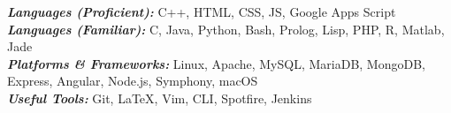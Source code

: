 

\begin{cvparagraph}
  \textbf{\textit{Languages (Proficient): }} C++, HTML, CSS, JS, Google Apps Script\\
  \textbf{\textit{Languages (Familiar): }}C, Java, Python, Bash, Prolog, Lisp, PHP, R, Matlab, Jade \\
  \textbf{\textit{Platforms \& Frameworks: }}Linux, Apache, MySQL, MariaDB, MongoDB, Express, Angular, Node.js, Symphony, macOS \\
  \textbf{\textit{Useful Tools: }}Git, \LaTeX, Vim, CLI, Spotfire, Jenkins
\end{cvparagraph}
